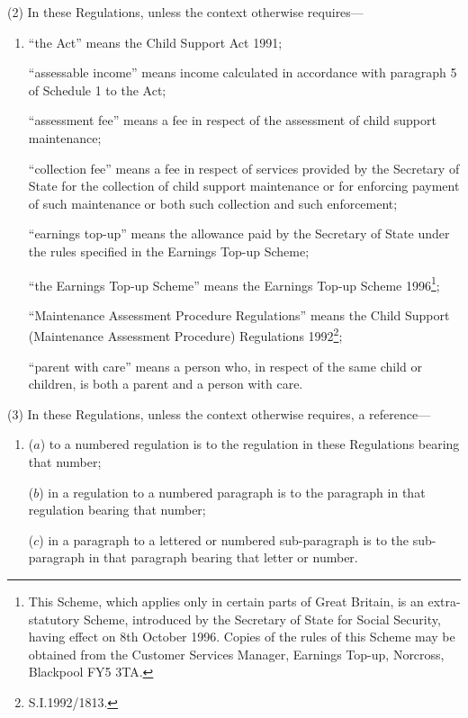 \documentclass[a4paper]{article}
\begin{document}
(2) In these Regulations, unless the context otherwise requires—
\begin{enumerate}\item[]
“the Act” means the Child Support Act 1991;

“assessable income” means income calculated in accordance with paragraph 5 of Schedule 1 to the Act;

“assessment fee” means a fee in respect of the assessment of child support maintenance;


“collection fee” means a fee in respect of services provided by the Secretary of State for the collection of child support maintenance or for enforcing payment of such maintenance or both such collection and such enforcement;

“earnings top-up” means the allowance paid by the Secretary of State under the rules specified in the Earnings Top-up Scheme;

“the Earnings Top-up Scheme” means the Earnings Top-up Scheme 1996\footnote{\frenchspacing This Scheme, which applies only in certain parts of Great Britain, is an extra-statutory Scheme, introduced by the Secretary of State for Social Security, having effect on 8th October 1996. Copies of the rules of this Scheme may be obtained from the Customer Services Manager, Earnings Top-up, Norcross, Blackpool FY5 3TA.};

“Maintenance Assessment Procedure Regulations” means the Child Support (Maintenance Assessment Procedure) Regulations 1992\footnote{\frenchspacing S.I.1992/1813.};

“parent with care” means a person who, in respect of the same child or children, is both a parent and a person with care.
\end{enumerate}

(3) In these Regulations, unless the context otherwise requires, a reference—
\begin{enumerate}\item[]
($a$) to a numbered regulation is to the regulation in these Regulations bearing that number;

($b$) in a regulation to a numbered paragraph is to the paragraph in that regulation bearing that number;

($c$) in a paragraph to a lettered or numbered sub-paragraph is to the sub-paragraph in that paragraph bearing that letter or number.
\end{enumerate}
\end{document}
